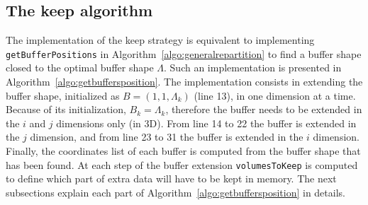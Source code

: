 \documentclass[conference]{IEEEtran}
\begin{document}
\subsection{The keep algorithm}

The implementation of the keep strategy is equivalent to implementing
\texttt{getBufferPositions} in Algorithm~\ref{algo:generalrepartition} to find a
buffer shape closed to the optimal buffer shape $\Lambda$. Such an implementation is
presented in Algorithm~\ref{algo:getbuffersposition}. The implementation
consists in extending the buffer shape, initialized as $B=(1,1,\Lambda_k)$ (line 13), in
one dimension at a time. Because of its initialization, $B_k=\Lambda_k$, therefore
the buffer needs to be extended in the $i$ and $j$ dimensions only (in 3D).
From line 14 to 22 the buffer is extended in the $j$
dimension, and from line 23 to 31 the buffer is extended in the $i$ dimension.
Finally, the coordinates list of each buffer is computed from the buffer shape
that has been found. At each step of the buffer extension \texttt{volumesToKeep}
is computed to define which part of extra data will have to be kept in memory.
The next subsections explain each part of Algorithm~\ref{algo:getbuffersposition}
in details.
\end{document}
